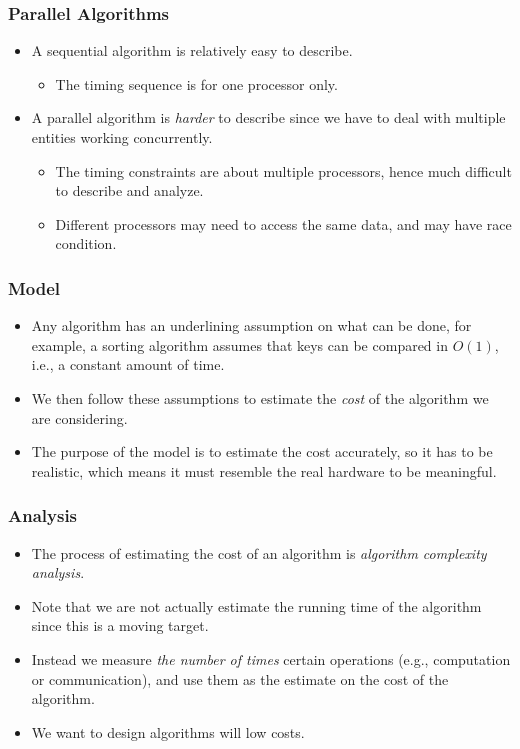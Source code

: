 \documentclass{beamer}
\begin{document}
\begin{CJK}{UTF8}{bsmi}
\begin{frame}
\frametitle{Parallel Algorithms}
\begin{itemize}
\item A sequential algorithm is relatively easy to describe.
\begin{itemize}
\item The timing sequence is for one processor only.
\end{itemize}
\item A parallel algorithm is {\em harder} to describe since we have
  to deal with multiple entities working concurrently.
\begin{itemize}
\item The timing constraints are about multiple processors, hence much
  difficult to describe and analyze.
\item Different processors may need to access the same data, and may
  have race condition.
\end{itemize}
\end{itemize}
\end{frame}

\begin{frame}
\frametitle{Model}
\begin{itemize}
\item Any algorithm has an underlining assumption on what can be done,
  for example, a sorting algorithm assumes that keys can be compared
  in $O(1)$, i.e., a constant amount of time.
\item We then follow these assumptions to estimate the {\em cost} of
  the algorithm we are considering.
\item The purpose of the model is to estimate the cost accurately, so
  it has to be realistic, which means it must resemble the real
  hardware to be meaningful.
\end{itemize}
\end{frame}

\begin{frame}
\frametitle{Analysis}
\begin{itemize}
\item The process of estimating the cost of an algorithm is {\em
  algorithm complexity analysis}.
\item Note that we are not actually estimate the running time of the
  algorithm since this is a moving target.
\item Instead we measure {\em the number of times} certain operations
  (e.g., computation or communication), and use them as the estimate
  on the cost of the algorithm.
\item We want to design algorithms will low costs.
\end{itemize}
\end{frame}



\end{CJK}
\end{document}
